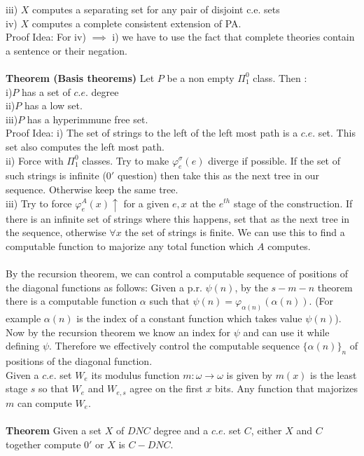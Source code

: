 \documentclass{article}
\begin{document}
	iii) $X$ computes a separating set for any pair of disjoint c.e. sets\\
	iv) $X$ computes a complete consistent extension of PA.\\
	Proof Idea: For iv) $\implies$ i) we have to use the fact that complete theories contain a sentence or their negation.\\
	\\
	\textbf{Theorem (Basis theorems)} Let $P$ be a non empty  $\Pi^0_1$ class. Then :\\
	i)$P$ has a  set of $c.e.$ degree \\
	ii)$P$ has a low set.\\
	iii)$P$ has a hyperimmune free set.
	\\
	Proof Idea: i) The set of strings to the left of the left most path is a $c.e.$ set. This set also computes the left most path.\\
	ii) Force with $\Pi^0_1$ classes. Try to make $\varphi_e^\sigma(e)$ diverge if possible. If the set of such strings is infinite ($0'$ question) then take this as the next tree in our sequence. Otherwise keep the same tree.\\
	iii) Try to force $\varphi^A_e(x)\uparrow$ for a given $e,x$ at the $e^{th}$ stage of the construction. If there is an infinite set of strings where this happens, set that as the next tree in the sequence, otherwise $\forall x$ the set of strings is finite. We can use this to find a computable function to majorize any total function which $A$ computes.
	\\
	\\
	By the recursion theorem, we can control a computable sequence of positions of the diagonal functions as follows: Given a  p.r. $\psi(n)$, by the $s-m-n$ theorem there is a computable function $\alpha$ such that $\psi(n) = \varphi_{\alpha(n)}(\alpha(n))$. (For example $\alpha(n)$ is the index of a constant function which takes value $\psi(n)$). Now by the recursion theorem we know an index for $\psi$ and can use it while defining $\psi$. Therefore we effectively control the computable sequence $\{\alpha(n)\}_n$ of positions of the diagonal function. \\
	Given a $c.e.$ set $W_e$ its modulus function $m: \omega \to \omega$ is given by $m(x)$ is the least stage $s$ so that $W_e$ and $W_{e,s}$ agree on the first $x$ bits. Any function that majorizes $m$ can compute $W_e$.\\
	\\
	\textbf{Theorem} Given a set $X$ of $DNC$ degree and a $c.e.$ set $C$, either $X$ and $C$ together compute $0'$ or $X$ is $C-DNC$.\\
\end{document}
